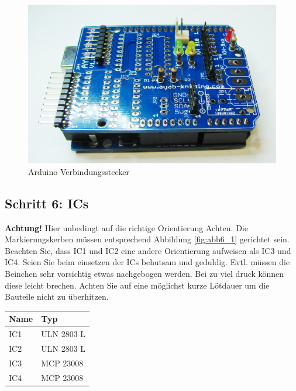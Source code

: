 \documentclass[fleqn,10pt]{SelfArx} %
\begin{document}
\begin{figure}[tbhp]\centering
\includegraphics[width=\linewidth]{abb5_2}
\caption{Arduino Verbindungsstecker}
\label{fig:abb5_2}
\end{figure}

\FloatBarrier

 \subsection*{Schritt 6: ICs}

\textbf{Achtung!} Hier unbedingt auf die richtige Orientierung Achten. Die Markierungskerben müssen entsprechend Abbildung \ref{fig:abb6_1} gerichtet sein. Beachten Sie, dass IC1 und IC2 eine andere Orientierung aufweisen als IC3 und IC4. Seien Sie beim einsetzen der ICs behutsam und geduldig. Evtl. müssen die Beinchen sehr vorsichtig etwas nachgebogen werden. Bei zu viel druck können diese leicht brechen. Achten Sie auf eine möglichst kurze Lötdauer um die Bauteile nicht zu überhitzen.\\
\begin{tabular}{ll}
\hline
\textbf{Name} & \textbf{Typ} \\ \hline
IC1           & ULN 2803 L   \\ \hline
IC2           & ULN 2803 L   \\ \hline
IC3           & MCP 23008    \\ \hline
IC4           & MCP 23008    \\ \hline
\end{tabular}\\
\end{document}
